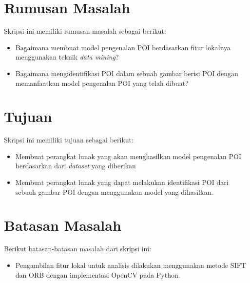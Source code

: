 \section{Rumusan Masalah}
\label{sec:rumusan}
Skripsi ini memiliki rumusan masalah sebagai berikut:
\begin{itemize}
	\item Bagaimana membuat model pengenalan POI berdasarkan fitur lokalnya menggunakan teknik \textit{data mining}?
	\item Bagaimana mengidentifikasi POI dalam sebuah gambar berisi POI dengan memanfaatkan model pengenalan POI yang telah dibuat?
\end{itemize}

\section{Tujuan}
\label{sec:tujuan}
Skripsi ini memiliki tujuan sebagai berikut:
\begin{itemize}
	\item Membuat perangkat lunak yang akan menghasilkan model pengenalan POI berdasarkan dari \textit{dataset} yang diberikan
	\item Membuat perangkat lunak yang dapat melakukan identifikasi POI dari sebuah gambar POI dengan menggunakan model yang dihasilkan.
\end{itemize}

\section{Batasan Masalah}
\label{sec:batasan}
Berikut batasan-batasan masalah dari skripsi ini:
\begin{itemize}
	\item Pengambilan fitur lokal untuk analisis dilakukan menggunakan metode SIFT dan ORB dengan implementasi OpenCV pada Python.
\end{itemize}

